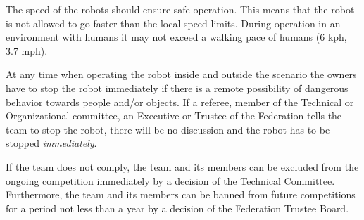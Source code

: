 The speed of the robots should ensure safe operation. This means that the robot is not allowed to go faster than the local speed limits. During operation in an environment with humans it may not exceed a walking pace of humans (6 kph, 3.7 mph). 

At any time when operating the robot inside and outside the scenario the owners have to stop the robot immediately if there is a remote possibility of dangerous behavior towards people and/or objects. If a referee, member of the Technical or Organizational committee, an Executive or Trustee of the \RC Federation tells the team to stop the robot, there will be no discussion and the robot has to be stopped \emph{immediately}.

If the team does not comply, the team and its members can be excluded from the ongoing competition immediately by a decision of the \RCAW Technical Committee. Furthermore, the team and its members can be banned from future competitions for a period not less than a year by a decision of the \RC Federation Trustee Board.

